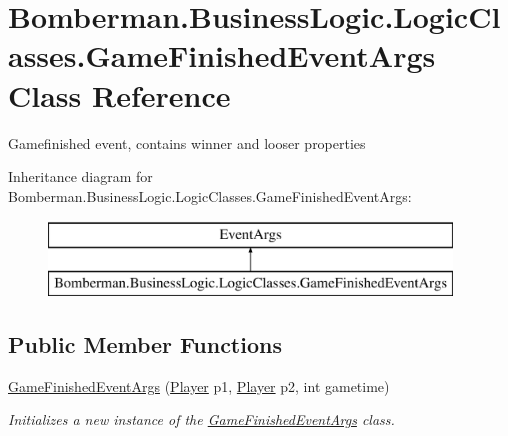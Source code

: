 \hypertarget{class_bomberman_1_1_business_logic_1_1_logic_classes_1_1_game_finished_event_args}{}\section{Bomberman.\+Business\+Logic.\+Logic\+Classes.\+Game\+Finished\+Event\+Args Class Reference}
\label{class_bomberman_1_1_business_logic_1_1_logic_classes_1_1_game_finished_event_args}


Gamefinished event, contains winner and looser properties  


Inheritance diagram for Bomberman.\+Business\+Logic.\+Logic\+Classes.\+Game\+Finished\+Event\+Args\+:\begin{figure}[H]
\begin{center}
\leavevmode
\includegraphics[height=2.000000cm]{class_bomberman_1_1_business_logic_1_1_logic_classes_1_1_game_finished_event_args}
\end{center}
\end{figure}
\subsection*{Public Member Functions}
\begin{DoxyCompactItemize}
\item 
\mbox{\hyperlink{class_bomberman_1_1_business_logic_1_1_logic_classes_1_1_game_finished_event_args_a41c78d251454239bbce2d6edbef201dd}{Game\+Finished\+Event\+Args}} (\mbox{\hyperlink{class_bomberman_1_1_model_1_1_player}{Player}} p1, \mbox{\hyperlink{class_bomberman_1_1_model_1_1_player}{Player}} p2, int gametime)
\begin{DoxyCompactList}\small\item\em Initializes a new instance of the \mbox{\hyperlink{class_bomberman_1_1_business_logic_1_1_logic_classes_1_1_game_finished_event_args}{Game\+Finished\+Event\+Args}} class. \end{DoxyCompactList}\end{DoxyCompactItemize}
